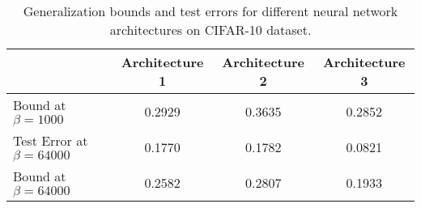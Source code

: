 
\begin{table}[h]
\centering
\begin{tabular}{|l|c|c|c|}
\hline
& Architecture 1 & Architecture 2 & Architecture 3 \\
\hline
Bound at $\beta = 1000$ & 0.2929 & 0.3635 & 0.2852 \\
\hline
Test Error at $\beta = 64000$ & 0.1770 & 0.1782 & 0.0821 \\
\hline
Bound at $\beta = 64000$ & 0.2582 & 0.2807 & 0.1933 \\
\hline
\end{tabular}
\caption{Generalization bounds and test errors for different neural network architectures on CIFAR-10 dataset.}
\label{tab:cifar_results}
\end{table}

